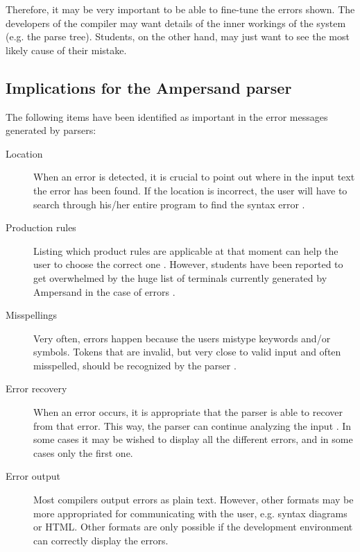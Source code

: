 Therefore, it may be very important to be able to fine-tune the errors shown.
The developers of the compiler may want details of the inner workings of the system (e.g. the parse tree).
Students, on the other hand, may just want to see the most likely cause of their mistake.

\subsection{Implications for the Ampersand parser}
\label{subsec:errors-ampersand}
The following items have been identified as important in the error messages generated by parsers:
\begin{description}
	\item[Location] When an error is detected, it is crucial to point out where in the input text the error has been found.
		If the location is incorrect, the user will have to search through his/her entire program to find the syntax error .
  \item[Production rules] Listing which product rules are applicable at that moment can help the user to choose the correct one .
		However, students have been reported to get overwhelmed by the huge list of terminals currently generated by Ampersand in the case of errors . 
	\item[Misspellings] Very often, errors happen because the users mistype keywords and/or symbols.
		Tokens that are invalid, but very close to valid input and often misspelled, should be recognized by the parser .
	\item[Error recovery] When an error occurs, it is appropriate that the parser is able to recover from that error.
		This way, the parser can continue analyzing the input .
		In some cases it may be wished to display all the different errors, and in some cases only the first one.
	\item[Error output] Most compilers output errors as plain text.
		However, other formats may be more appropriated for communicating with the user, e.g. syntax diagrams or HTML.
		Other formats are only possible if the development environment can correctly display the errors.
\end{description}
